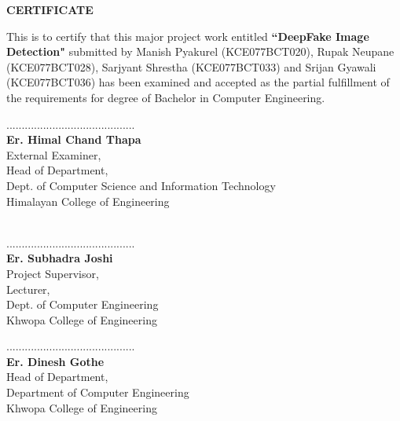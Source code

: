 \begin{center}
	\large{\textbf{CERTIFICATE}}
\end{center}
\vspace{1cm}
This is to certify that this major project work entitled \textbf{``DeepFake Image Detection"} submitted by Manish Pyakurel (KCE077BCT020), Rupak Neupane (KCE077BCT028), Sarjyant Shrestha (KCE077BCT033) and Srijan Gyawali\\(KCE077BCT036) has been examined and accepted as the partial fulfillment of the requirements for degree of Bachelor in Computer Engineering.\\
\vspace{1in}
\begin{multicols}{2}
	\begin{center}
		..........................................\\
		\textbf{Er. Himal Chand Thapa}\\
		External Examiner,\\
    Head of Department,\\
		Dept. of Computer Science and Information Technology\\
		Himalayan College of Engineering\\
		\textbf{}\\
		
	\end{center}

\columnbreak
	\begin{center}
		..........................................\\
		\textbf{Er. Subhadra Joshi}\\
		Project Supervisor,\\
    Lecturer,\\
    Dept. of Computer Engineering\\
    Khwopa College of Engineering
	\end{center}
\end{multicols}
\vspace{1in}
\begin{center}
	..........................................\\
	\textbf{Er. Dinesh Gothe}\\
	Head of Department,\\
	Department of Computer Engineering\\
	Khwopa College of Engineering
\end{center}
\pagebreak



